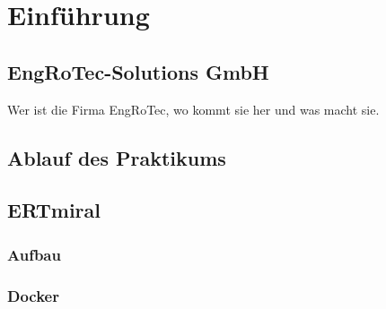 \chapter{Einführung}
\label{chp:Einführung}
 
\section{EngRoTec-Solutions GmbH}
Wer ist die Firma EngRoTec, wo kommt sie her und was macht sie. \\

\section{Ablauf des Praktikums}

\newpage
\section{ERTmiral}
\subsection{Aufbau}
\subsection{Docker}